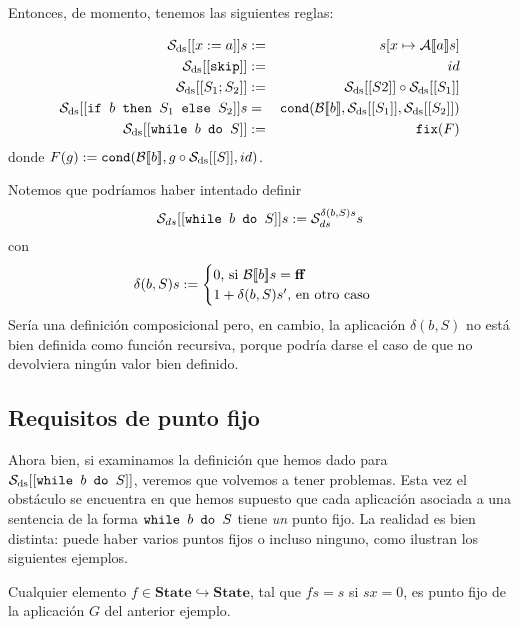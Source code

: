 Entonces, de momento, tenemos las siguientes reglas: 

\begin{sist*}\label{whileds}
\begin{eqnarray*}
    \mathcal{S}_{\mathrm{ds}} [[x:=a]]s &:=& s[x\mapsto \mathcal{A}[\![a]\!]s] \\
    \mathcal{S}_{\mathrm{ds}} [[\texttt{skip}]] &:=& id \\
    \mathcal{S}_{\mathrm{ds}} [[S_1;S_2]] &:=& \mathcal{S}_{\mathrm{ds}} [[S2]] \circ \mathcal{S}_{\mathrm{ds}} [[S_1]] \\
    \mathcal{S}_{\mathrm{ds}} [[\texttt{if } b\texttt{ then } S_1\texttt{ else } S_2]]s &=&  \texttt{cond}(\mathcal{B}[\![b]\!], \mathcal{S}_{\mathrm{ds}} [[S_1]], \mathcal{S}_{\mathrm{ds}} [[S_2]])\\
    \mathcal{S}_{\mathrm{ds}} [[\texttt{while } b \texttt{ do } S]] &:=&  \texttt{fix}(F)\\
\end{eqnarray*}
donde $F(g) := \texttt{cond}(\mathcal{B}[\![b]\!], g\circ \mathcal{S}_{\mathrm{ds}}[[S]], id)$.
\end{sist*}

Notemos que podríamos haber intentado definir 
$$\mathcal{S}_{ds}[[\texttt{while } b \texttt{ do } S]]s := \mathcal{S}_{ds}^{\delta(b, S)s}s$$
con 
$$\delta(b, S)s := \begin{cases}
    0 \text{, si } \mathcal{B}[\![b]\!]s = \mathbf{ff} \\
    1 + \delta(b, S)s' \text{, en otro caso}
\end{cases}$$
Sería una definición composicional pero, en cambio, la aplicación $\delta(b, S)$ no está bien definida como función recursiva, porque podría darse el caso de que no devolviera ningún valor bien definido.

\subsection{Requisitos de punto fijo}

Ahora bien, si examinamos la definición que hemos dado para $\mathcal{S}_{\mathrm{ds}} [[\texttt{while } b \texttt{ do } S]]$, veremos que volvemos a tener problemas. Esta vez el obstáculo se encuentra en que hemos supuesto que cada aplicación asociada a una sentencia de la forma $\texttt{while } b \texttt{ do } S$ tiene \textit{un} punto fijo. La realidad es bien distinta: puede haber varios puntos fijos o incluso ninguno, como ilustran los siguientes ejemplos.

\begin{example}
Cualquier elemento $f \in  \mathbf{State}\hookrightarrow \mathbf{State}$, tal que $fs =s$ si $sx = 0$, es punto fijo de la aplicación $G$ del anterior ejemplo.
\end{example}

